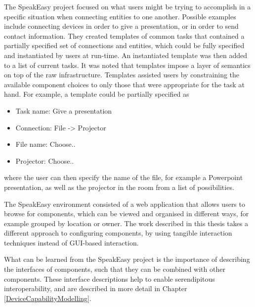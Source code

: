 \label{InformationFiltering} %
The SpeakEasy project focused on what users might be trying to accomplish in a specific situation when connecting entities to one another. Possible examples include connecting devices in order to give a presentation, or in order to send contact information. They created templates of common tasks that contained a partially specified set of connections and entities, which could be fully specified and instantiated by users at run-time. An instantiated template was then added to a list of current tasks. It was noted that templates impose a layer of semantics on top of the raw infrastructure. Templates assisted users by constraining the available component choices to only those that were appropriate for the task at hand. For example, a template could be partially specified as

\begin{itemize}
	\item Task name: Give a presentation
	\item Connection: File -> Projector
	\item File name: Choose..
	\item Projector: Choose..
\end{itemize}

where the user can then specify the name of the file, for example a Powerpoint presentation, as well as the projector in the room from a list of possibilities.

The SpeakEasy environment consisted of a web application that allows users to browse for components, which can be viewed and organised in different ways, for example grouped by location or owner. The work described in this thesis takes a different approach to configuring components, by using tangible interaction techniques instead of \ac{GUI}-based interaction.

What can be learned from the SpeakEasy project is the importance of describing the interfaces of components, such that they can be combined with other components. These interface descriptions help to enable serendipitous interoperability, and are described in more detail in Chapter \ref{DeviceCapabilityModelling}. 


